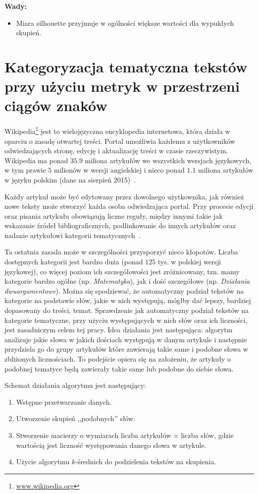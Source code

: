 \documentclass{praca1}
\begin{document}
\textbf{Wady:}
\begin{itemize}
\item Miara silhouette przyjmuje w ogólności większe wartości dla wypukłych skupień.
\end{itemize}


\chapter{Kategoryzacja tematyczna tekstów przy użyciu metryk w przestrzeni ciągów znaków}

Wikipedia\footnote{\url{www.wikipedia.org}} jest to wielojęzyczna encyklopedia internetowa, która działa w oparciu o zasadę otwartej treści. Portal umożliwia każdemu z użytkowników odwiedzających stronę, edycję i aktualizację treści w czasie rzeczywistym. Wikipedia ma ponad $35.9$ miliona artykułów we wszystkich wersjach językowych, w tym prawie $5$ milionów w wersji angielskiej i nieco ponad $1.1$ miliona artykułów w języku polskim (dane na sierpień 2015)~\cite{wiki}.

Każdy artykuł może być edytowany przez dowolnego użytkownika, jak również nowe teksty może stworzyć każda osoba odwiedzająca portal. Przy procesie edycji oraz pisania artykułu obowiązują liczne reguły, między innymi takie jak wskazanie źródeł bibliograficznych, podlinkowanie do innych artykułów oraz nadanie artykułowi kategorii tematycznych~\cite{wiki}. 

Ta ostatnia zasada może w szczególności przysporzyć nieco kłopotów. Liczba dostępnych kategorii jest bardzo duża (ponad $125$ tys. w polskiej wersji językowej), co więcej poziom ich szczegółowości jest zróżnicowany, tzn. mamy kategorie bardzo ogólne (np. \emph{Matematyka}), jak i dość szczegółowe (np. \emph{Działania dwuargumentowe}). Można się spodziewać, że automatyczny podział tekstów na kategorie na podstawie słów, jakie w nich występują, mógłby dać lepszy, bardziej dopasowany do treści, temat. Sprawdzenie jak automatyczny podział tekstów na kategorie tematyczne, przy użyciu występujących w nich słów oraz ich liczności, jest zasadniczym celem tej pracy. Idea działania jest następująca: algorytm analizuje jakie słowa w jakich ilościach występują w danym artykule i następnie przydziela go do grupy artykułów które zawierają takie same i podobne słowa w zbliżonych licznościach. To podejście opiera się na założeniu, że artykuły o podobnej tematyce będą zawierały takie same lub podobne do siebie słowa. 

Schemat działania algorytmu jest następujący:
\begin{enumerate}
\item Wstępne przetwarzanie danych.
\item Utworzenie skupień ,,podobnych'' słów.
\item Stworzenie macierzy o wymiarach liczba artykułów $\times$ liczba słów, gdzie wartością jest liczność występowania danego słowa w artykule.
\item Użycie algorytmu $k$-średnich do podzielenia tekstów na skupienia.
\end{enumerate}
\end{document}
